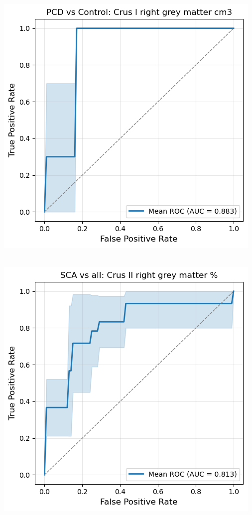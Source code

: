 \documentclass{standalone}
\begin{document}
\begin{minipage}[t]{0.19\textwidth}
    \textbf{}\\[4pt]
    \includegraphics[width=\textwidth]{graphics/ROC_PCD_vs_Control.png}
\end{minipage}
\begin{minipage}[t]{0.19\textwidth}
    \textbf{}\\[4pt]
    \includegraphics[width=\textwidth]{graphics/ROC_SCA_vs_all.png}
\end{minipage}
\end{document}
